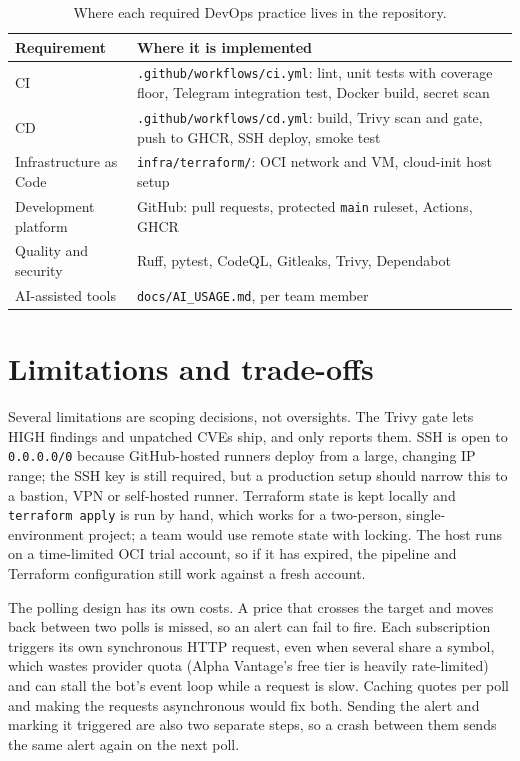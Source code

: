 \documentclass[11pt,a4paper]{article}
\begin{document}
\begin{table}[h]
\centering\small
\begin{tabularx}{\textwidth}{@{}lX@{}}
\toprule
\textbf{Requirement} & \textbf{Where it is implemented} \\
\midrule
CI & \texttt{.github/workflows/ci.yml}: lint, unit tests with coverage floor, Telegram integration test, Docker build, secret scan \\
CD & \texttt{.github/workflows/cd.yml}: build, Trivy scan and gate, push to GHCR, SSH deploy, smoke test \\
Infrastructure as Code & \texttt{infra/terraform/}: OCI network and VM, cloud-init host setup \\
Development platform & GitHub: pull requests, protected \texttt{main} ruleset, Actions, GHCR \\
Quality and security & Ruff, pytest, CodeQL, Gitleaks, Trivy, Dependabot \\
AI-assisted tools & \texttt{docs/AI\_USAGE.md}, per team member \\
\bottomrule
\end{tabularx}
\caption{Where each required DevOps practice lives in the repository.}
\end{table}

\section{Limitations and trade-offs}

Several limitations are scoping decisions, not oversights. The Trivy gate lets HIGH findings and unpatched CVEs ship, and only reports them. SSH is open to \texttt{0.0.0.0/0} because GitHub-hosted runners deploy from a large, changing IP range; the SSH key is still required, but a production setup should narrow this to a bastion, VPN or self-hosted runner. Terraform state is kept locally and \texttt{terraform apply} is run by hand, which works for a two-person, single-environment project; a team would use remote state with locking. The host runs on a time-limited OCI trial account, so if it has expired, the pipeline and Terraform configuration still work against a fresh account.

The polling design has its own costs. A price that crosses the target and moves back between two polls is missed, so an alert can fail to fire. Each subscription triggers its own synchronous HTTP request, even when several share a symbol, which wastes provider quota (Alpha Vantage's free tier is heavily rate-limited) and can stall the bot's event loop while a request is slow. Caching quotes per poll and making the requests asynchronous would fix both. Sending the alert and marking it triggered are also two separate steps, so a crash between them sends the same alert again on the next poll.
\end{document}
